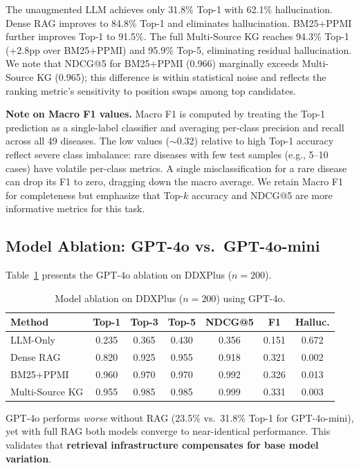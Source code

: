 \documentclass[runningheads]{llncs}
\begin{document}
The unaugmented LLM achieves only 31.8\% Top-1 with 62.1\% hallucination. Dense RAG improves to 84.8\% Top-1 and eliminates hallucination. BM25+PPMI further improves Top-1 to 91.5\%. The full Multi-Source KG reaches 94.3\% Top-1 (+2.8pp over BM25+PPMI) and 95.9\% Top-5, eliminating residual hallucination. We note that NDCG@5 for BM25+PPMI (0.966) marginally exceeds Multi-Source KG (0.965); this difference is within statistical noise and reflects the ranking metric's sensitivity to position swaps among top candidates.

\textbf{Note on Macro F1 values.} Macro F1 is computed by treating the Top-1 prediction as a single-label classifier and averaging per-class precision and recall across all 49 diseases. The low values (${\sim}$0.32) relative to high Top-1 accuracy reflect severe class imbalance: rare diseases with few test samples (e.g., 5--10 cases) have volatile per-class metrics. A single misclassification for a rare disease can drop its F1 to zero, dragging down the macro average. We retain Macro F1 for completeness but emphasize that Top-$k$ accuracy and NDCG@5 are more informative metrics for this task.

\subsection{Model Ablation: GPT-4o vs.\ GPT-4o-mini}
\label{sec:model_ablation}

Table~\ref{tab:gpt4o} presents the GPT-4o ablation on DDXPlus ($n{=}200$).

\begin{table}[t]
\centering
\caption{Model ablation on DDXPlus ($n{=}200$) using GPT-4o.}
\label{tab:gpt4o}
\begin{tabular}{lcccccc}
\toprule
\textbf{Method} & \textbf{Top-1} & \textbf{Top-3} & \textbf{Top-5} & \textbf{NDCG@5} & \textbf{F1} & \textbf{Halluc.} \\
\midrule
LLM-Only       & 0.235 & 0.365 & 0.430 & 0.356 & 0.151 & 0.672 \\
Dense RAG       & 0.820 & 0.925 & 0.955 & 0.918 & 0.321 & 0.002 \\
BM25+PPMI       & 0.960 & 0.970 & 0.970 & 0.992 & 0.326 & 0.013 \\
Multi-Source KG & 0.955 & 0.985 & 0.985 & 0.999 & 0.331 & 0.003 \\
\bottomrule
\end{tabular}
\end{table}

GPT-4o performs \emph{worse} without RAG (23.5\% vs.\ 31.8\% Top-1 for GPT-4o-mini), yet with full RAG both models converge to near-identical performance. This validates that \textbf{retrieval infrastructure compensates for base model variation}.
\end{document}
